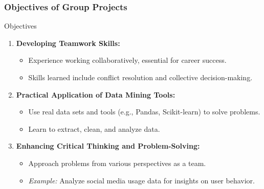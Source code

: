 \documentclass[aspectratio=169]{beamer}
\begin{document}
\begin{frame}[fragile]
    \frametitle{Objectives of Group Projects}
    \begin{block}{Objectives}
        \begin{enumerate}
            \item \textbf{Developing Teamwork Skills:}
            \begin{itemize}
                \item Experience working collaboratively, essential for career success.
                \item Skills learned include conflict resolution and collective decision-making.
            \end{itemize}
            \item \textbf{Practical Application of Data Mining Tools:}
            \begin{itemize}
                \item Use real data sets and tools (e.g., Pandas, Scikit-learn) to solve problems.
                \item Learn to extract, clean, and analyze data.
            \end{itemize}
            \item \textbf{Enhancing Critical Thinking and Problem-Solving:}
            \begin{itemize}
                \item Approach problems from various perspectives as a team.
                \item \textit{Example:} Analyze social media usage data for insights on user behavior.
            \end{itemize}
        \end{enumerate}
    \end{block}
\end{frame}
\end{document}
